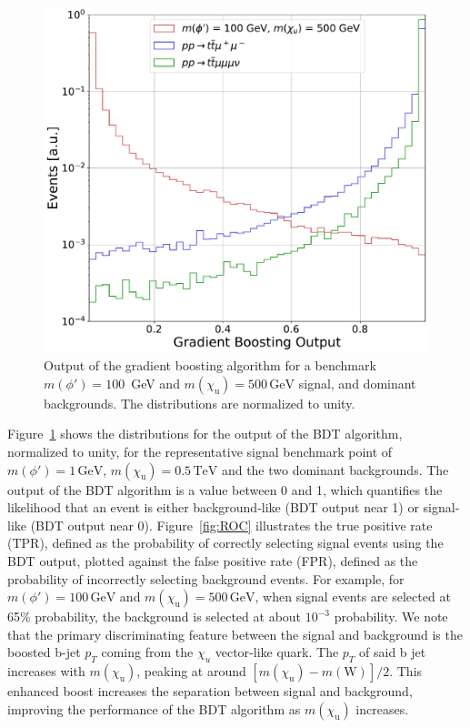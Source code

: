 \begin{figure}
\centering
  \centering  \includegraphics[width=.75\linewidth]{Images/XGB_output.pdf}
  \caption{Output of the gradient boosting algorithm for a benchmark $m(\phi') = 100$~\textrm{GeV} and $m(\chi_\mathrm{u}) = 500\, \mathrm{GeV}$ signal, and dominant backgrounds. The distributions are normalized to unity.}
  \label{fig:xgboostout}
\end{figure}

Figure~\ref{fig:xgboostout} shows  the distributions for the output of the BDT algorithm, normalized to unity, for the representative signal benchmark point of $m(\phi') = 1\, \mathrm{GeV}$, $m(\chi_\mathrm{u}) = 0.5\, \mathrm{TeV}$ and the two dominant backgrounds. The output of the BDT algorithm is a value between 0 and 1, which quantifies the likelihood that an event is either background-like (BDT output near 1) or signal-like (BDT output near 0). Figure~\ref{fig:ROC} illustrates the true positive rate (TPR), defined as the probability of correctly selecting signal events using the BDT output, plotted against the false positive rate (FPR), defined as the probability of incorrectly selecting background events. For example, for $m(\phi') = 100\, \mathrm{GeV}$ and $m(\chi_\mathrm{u}) = 500\, \mathrm{GeV}$, when signal events are selected at 65\% probability, the background is selected at about $10^{-3}$ probability. We note that the primary discriminating feature between the signal and background is the boosted b-jet $p_T$ coming from the $\chi_u$ vector-like quark. The $p_T$ of said b jet increases with $m(\chi_\mathrm{u})$, peaking at around $[m(\chi_\mathrm{u}) - m(\textrm{W})] / 2$. This enhanced boost increases the separation between signal and background, improving the performance of the BDT algorithm as $m(\chi_\mathrm{u})$ increases. 

